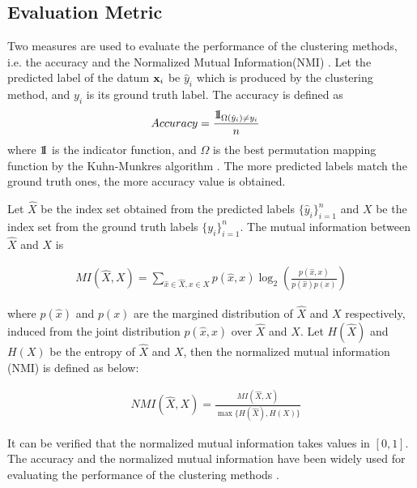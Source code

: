 \documentclass[10pt,twocolumn,letterpaper]{article}
\begin{document}
\subsection{Evaluation Metric}
Two measures are used to evaluate the performance of the clustering
methods, i.e. the accuracy and the Normalized Mutual Information(NMI) \cite{Zheng04}. Let the predicted label of the datum $\mathbf{x}_i$ be $\hat y_i$ which is produced by the clustering method, and $y_i$ is its ground truth label. The accuracy is defined as
\begin{align}\label{eq:accuracy}
&{Accuracy} = \frac{{\rm 1}\kern-0.25em{\rm I}_{{\Omega}(\hat y_i) \ne y_i}}{n}
\end{align}
\noindent where ${\rm 1}\kern-0.25em{\rm I}$ is the indicator function, and $\Omega$ is the best permutation mapping
function by the Kuhn-Munkres algorithm \cite{plummer1986}. The more predicted labels match the ground truth ones, the more accuracy value is obtained.

Let $\hat X$ be the index set obtained from the predicted labels $\{\hat y_i\}_{i=1}^n$ and $X$ be the index set from the ground truth labels $\{y_i\}_{i=1}^n$. The mutual information between ${\hat X}$ and $X$ is
\begin{small}\begin{align}\label{eq:MI}
MI( {\hat X,X}) = \sum\limits_{\hat x \in \hat X,x \in X} {p( {\hat x,x} ){{\log }_2}( {\frac{{p( {\hat x,x} )}}{{p( {\hat x} )p( x )}}} )}
\end{align}\end{small}
\noindent where $p(\hat x)$ and $p(x)$ are the margined distribution of $\hat X$ and $X$ respectively, induced from the joint distribution $p(\hat x, x)$ over $\hat X$ and $X$. Let $H( {\hat X} )$ and $H( X )$ be the entropy of $\hat X$ and $X$, then the normalized mutual information (NMI) is defined as below:
\begin{small}\begin{align}\label{eq:NMI}
&NMI( {\hat X,X} ) = \frac{{MI( {\hat X,X} )}}{{\max \{ {H( {\hat X} ),H( X )}\}}}
\end{align}\end{small}
It can be verified that the normalized mutual information takes values in $[0,1]$. The accuracy and the normalized mutual information have been widely used for evaluating the performance of the clustering methods \cite{Zheng11,ChengYYFH10,Zheng04}.
\end{document}
